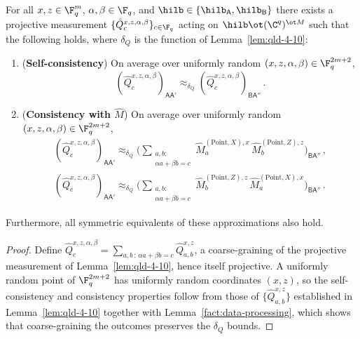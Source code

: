\begin{lemma}
	\label{lem:qld-4-12}
	\leanok
	For all $x, z \in \F_q^m$, $\alpha, \beta \in \F_q$, and
	$\hilb \in \{\hilb_{\mathsf{A}}, \hilb_{\mathsf{B}}\}$ there exists a
	projective measurement
	$\{\hat{Q}^{x,z,\alpha,\beta}_{c}\}_{c \in \F_q}$ acting on
	$\hilb \ot (\C^q)^{\ot M}$ such that the following holds, where
	$\delta_Q$ is the function of Lemma~\ref{lem:qld-4-10}:
	\begin{enumerate}
		\item (\textbf{Self-consistency}) On average over uniformly random
		$(x, z, \alpha, \beta) \in \F_q^{2m+2}$,
		\begin{equation}
			\label{eq:qld-4-12-self-cons}
			(\hat{Q}^{x,z,\alpha,\beta}_{c})_{\mathsf{A}\mathsf{A}'}
			\approx_{\delta_Q}
			(\hat{Q}^{x,z,\alpha,\beta}_{c})_{\mathsf{B}\mathsf{A}''}\,.
		\end{equation}
		\item (\textbf{Consistency with $\hat{M}$}) On average over uniformly
		random $(x, z, \alpha, \beta) \in \F_q^{2m+2}$,
		\begin{gather}
			\label{eq:qld-4-12-cons-m-hat}
			(\hat{Q}^{x,z,\alpha,\beta}_{c})_{\mathsf{A}\mathsf{A}'}
			\approx_{\delta_Q}
			\Big( \sum_{\substack{a,b:\\ \alpha a + \beta b = c}}
			\hat{M}^{(\mathrm{Point},X),x}_{a} \,
			\hat{M}^{(\mathrm{Point},Z),z}_{b}
			\Big)_{\mathsf{B}\mathsf{A}''}\,, \\
			\label{eq:qld-4-12-cons-m-hat2}
			(\hat{Q}^{x,z,\alpha,\beta}_{c})_{\mathsf{A}\mathsf{A}'}
			\approx_{\delta_Q}
			\Big( \sum_{\substack{a,b:\\ \alpha a + \beta b = c}}
			\hat{M}^{(\mathrm{Point},Z),z}_{b} \,
			\hat{M}^{(\mathrm{Point},X),x}_{a}
			\Big)_{\mathsf{B}\mathsf{A}''}\,.
		\end{gather}
	\end{enumerate}
	Furthermore, all symmetric equivalents of these approximations also hold.
\end{lemma}
\begin{proof}
	\leanok
	Define
	$\hat{Q}^{x,z,\alpha,\beta}_{c}
	= \sum_{a,b \,:\, \alpha a + \beta b = c} \hat{Q}^{x,z}_{a,b}$,
	a coarse-graining of the projective measurement of
	Lemma~\ref{lem:qld-4-10}, hence itself projective. A uniformly random
	point of $\F_q^{2m+2}$ has uniformly random coordinates $(x,z)$, so the
	self-consistency and consistency properties follow from those of
	$\{\hat{Q}^{x,z}_{a,b}\}$ established in Lemma~\ref{lem:qld-4-10}
	together with Lemma~\ref{fact:data-processing}, which shows that
	coarse-graining the outcomes preserves the $\delta_Q$ bounds.
\end{proof}

